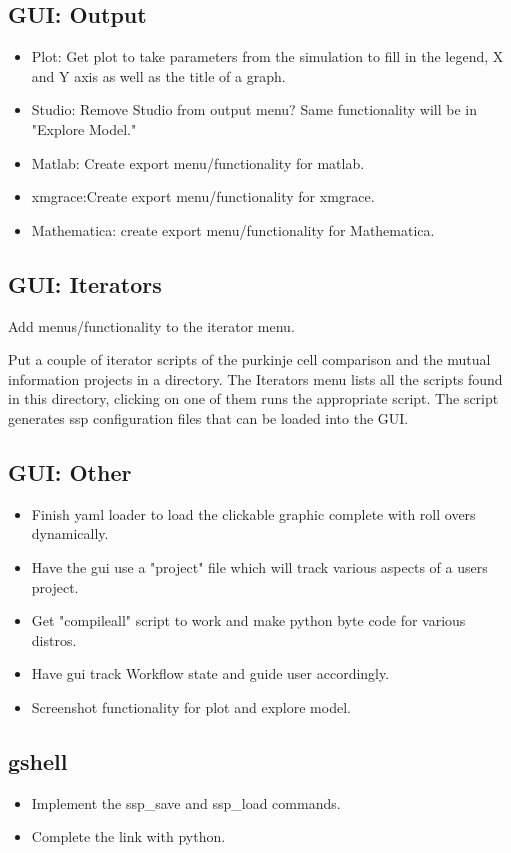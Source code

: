 \documentclass[12pt]{article}
\begin{document}
\subsection{GUI: Output}
\begin{itemize}
\item Plot: Get plot to take parameters from the simulation to fill in
  the legend, X and Y axis as well as the title of a graph.
\item Studio: Remove Studio from output menu? Same functionality will be in "Explore Model."
\item Matlab: Create export menu/functionality for matlab.
\item xmgrace:Create export menu/functionality for xmgrace.
\item Mathematica: create export menu/functionality for Mathematica.
\end{itemize}


\subsection{GUI: Iterators}
Add menus/functionality to the iterator menu.

Put a couple of iterator scripts of the purkinje cell comparison and
the mutual information projects in a directory.  The Iterators menu
lists all the scripts found in this directory, clicking on one of them
runs the appropriate script.  The script generates ssp configuration
files that can be loaded into the GUI.


\subsection{GUI: Other}
\begin{itemize}
\item Finish yaml loader to load the clickable graphic complete with
  roll overs dynamically.
\item Have the gui use a "project" file which will track various
  aspects of a users project.
\item Get "compileall" script to work and make python byte code for
  various distros.
\item Have gui track Workflow state and guide user accordingly.
\item Screenshot functionality for plot and explore model.
\end{itemize}

\subsection{gshell}
\begin{itemize}
\item Implement the ssp\_save and ssp\_load commands.
\item Complete the link with python.
\end{itemize}
\end{document}
